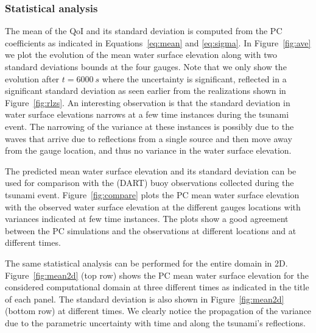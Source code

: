 \documentclass[review,12pt]{elsarticle}
\begin{document}
\subsubsection{Statistical analysis}
The mean of the QoI and its standard deviation is computed
from the PC coefficients as indicated in Equations~\eqref{eq:mean} and \eqref{eq:sigma}. 
In Figure~\ref{fig:ave} we plot the evolution of
the mean water surface elevation along with two standard deviations
bounds at the four gauges.  
Note that we only show the evolution after $t=6000~s$ where the uncertainty is significant,
reflected in a significant standard deviation as seen earlier from the realizations shown 
in Figure~\ref{fig:rlzs}. An interesting observation is that the
standard deviation in water surface elevations narrows at a few time instances
during the tsunami event.  The narrowing of the variance at these instances is
possibly due to the waves that arrive due to reflections from a single source
and then move away from the gauge location, and thus no variance in the water
surface elevation.


The predicted mean water surface elevation  and its standard deviation 
can be used for comparison with the (DART) buoy observations collected during
the tsunami event. Figure~\ref{fig:compare} 
plots the PC mean water surface elevation with the observed 
water surface elevation at the different gauges locations
with variances indicated at few time instances. 
The plots show a good agreement between the PC simulations and the 
observations at different locations and at different times. 

The same statistical analysis can be performed for the
entire domain in 2D. Figure~\ref{fig:mean2d} (top row) shows
the PC mean water surface elevation for the considered computational
domain at three different times as indicated in the title of each panel.
The standard deviation is also shown in Figure~\ref{fig:mean2d} (bottom row)
at different times. We clearly notice the propagation of the variance
due to the parametric uncertainty with time
and along the tsunami's reflections. 

        
\end{document}
